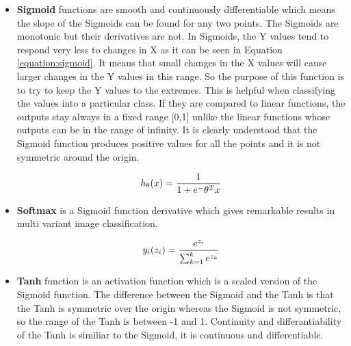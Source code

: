         \begin{itemize}

            \item \textbf{Sigmoid} functions are smooth and continuously differentiable which means the slope of the Sigmoids can be found for any two points.
                    The Sigmoids are monotonic but their derivatives are not.
                    In Sigmoids, the Y values tend to respond very less to changes in X as it can be seen in Equation \eqref{equation:sigmoid}.
                    It means that small changes in the X values will cause larger changes in the Y values in this range.
                    So the purpose of this function is to try to keep the Y values to the extremes.
                    This is helpful when classifying the values into a particular class.
                    If they are compared to linear functions, the outputs stay always  in a fixed range [0,1] unlike the linear functions whose outputs can be in the range of infinity.
                    It is clearly understood that the Sigmoid function produces positive values for all the points and it is not symmetric around the origin.

                    \begin{equation}
                        h_ \theta (x) =  \frac{\mathrm{1} }{\mathrm{1} + e^- \theta^Tx } \label{equation:sigmoid} \\
                    \end{equation}

            \item \textbf{Softmax} is a Sigmoid function derivative which gives remarkable results in multi variant image classification.

                    \begin{equation}
                        y_i(z_i) = \frac{e^{z_i}}{ \sum\nolimits_{k=1}^{k}{e^{z_k}} } \label{equation:softmax} \\
                    \end{equation}

            \item \textbf{Tanh} function is an activation function which is a scaled version of the Sigmoid function.
                    The difference between the Sigmoid and the Tanh is that the Tanh is symmetric over the origin whereas the Sigmoid is not symmetric, so the range of the Tanh is between -1 and 1.
                    Continuity and differantiability of the Tanh is similiar to the Sigmoid, it is continuous and differentiable.


\end{itemize}
